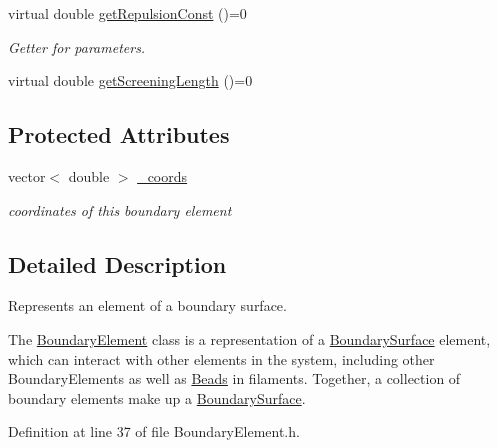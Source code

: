 {\bf }\par
\begin{DoxyCompactItemize}
\item 
virtual double \hyperlink{classBoundaryElement_aff96a5a1faa7df9b30899d9c3de84f4a}{get\+Repulsion\+Const} ()=0
\begin{DoxyCompactList}\small\item\em Getter for parameters. \end{DoxyCompactList}\item 
virtual double \hyperlink{classBoundaryElement_a075dff05ab75cfd8be7f1a731030045a}{get\+Screening\+Length} ()=0
\end{DoxyCompactItemize}

\subsection*{Protected Attributes}
\begin{DoxyCompactItemize}
\item 
vector$<$ double $>$ \hyperlink{classBoundaryElement_ab51302e10e3e2def98438234ba5bf801}{\+\_\+coords}
\begin{DoxyCompactList}\small\item\em coordinates of this boundary element \end{DoxyCompactList}\end{DoxyCompactItemize}


\subsection{Detailed Description}
Represents an element of a boundary surface. 

The \hyperlink{classBoundaryElement}{Boundary\+Element} class is a representation of a \hyperlink{classBoundarySurface}{Boundary\+Surface} element, which can interact with other elements in the system, including other Boundary\+Elements as well as \hyperlink{classBead}{Beads} in filaments. Together, a collection of boundary elements make up a \hyperlink{classBoundarySurface}{Boundary\+Surface}. 

Definition at line 37 of file Boundary\+Element.\+h.




